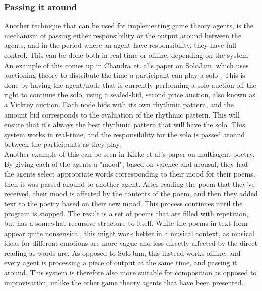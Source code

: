 \documentclass[a4paper,english]{report}
\begin{document}
	\subsubsection{Passing it around}
	Another technique that can be used for implementing game theory agents, is the mechanism of passing either responsibility or the output around between the agents, and in the period where an agent have responsibility, they have full control. This can be done both in real-time or offline, depending on the system.\\
	An example of this comes up in Chandra et. al's paper on SoloJam, which uses auctioning theory to distribute the time a participant can play a solo \cite{chandra2012market}. This is done by having the agent/node that is currently performing a solo auction off the right to continue the solo, using a sealed-bid, second price auction, also known as a Vickrey auction. Each node bids with its own rhythmic pattern, and the amount bid corresponds to the evaluation of the rhythmic pattern. This will ensure that it's always the best rhythmic pattern that will have the solo. This system works in real-time, and the responsibility for the solo is passed around between the participants as they play.\\
	Another example of this can be seen in Kirke et al.'s paper on multiagent poetry.\cite{kirke2013emotional} By giving each of the agents a "mood", based on valence and arousal, they had the agents select appropriate words corresponding to their mood for their poems, then it was passed around to another agent. After reading the poem that they've received, their mood is affected by the contents of the poem, and then they added text to the poetry based on their new mood. This process continues until the program is stopped. The result is a set of poems that are filled with repetition, but has a somewhat recursive structure  to itself. While the poems in text form appear quite nonsensical, this might work better in a musical context, as musical ideas for different emotions are more vague and less directly affected by the direct reading as words are. As opposed to SoloJam, this instead works offline, and every agent is processing a piece of output at the same time, and passing it around. This system is therefore also more suitable for composition as opposed to improvisation, unlike the other game theory agents that have been presented.\\
	
	
	\iffalse
\end{document}
